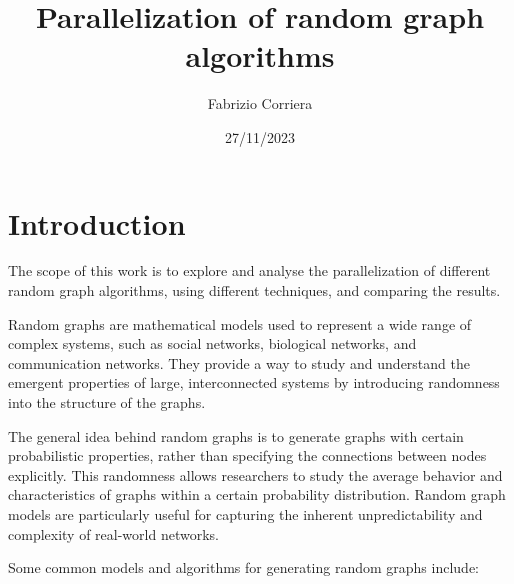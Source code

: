 \documentclass[titlepage]{article}
\title{Parallelization of random graph algorithms}
\author{Fabrizio Corriera}
\date{27/11/2023}
\begin{document}
\maketitle

\tableofcontents
\newpage
{}

\section{Introduction}
The scope of this work is to explore and analyse the parallelization of different random graph algorithms, using different techniques, and comparing the results.

Random graphs are mathematical models used to represent a wide range of complex systems, such as social networks, biological networks, and communication networks. They provide a way to study and understand the emergent properties of large, interconnected systems by introducing randomness into the structure of the graphs.

The general idea behind random graphs is to generate graphs with certain probabilistic properties, rather than specifying the connections between nodes explicitly. This randomness allows researchers to study the average behavior and characteristics of graphs within a certain probability distribution. Random graph models are particularly useful for capturing the inherent unpredictability and complexity of real-world networks.

Some common models and algorithms for generating random graphs include:
\end{document}
